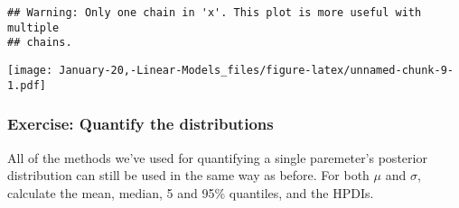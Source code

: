 \documentclass[]{article}
\begin{document}
\begin{verbatim}
## Warning: Only one chain in 'x'. This plot is more useful with multiple
## chains.
\end{verbatim}

\texttt{[image: January-20,-Linear-Models\_files/figure-latex/unnamed-chunk-9-1.pdf]}

\hypertarget{exercise-quantify-the-distributions}{%
\subsubsection{Exercise: Quantify the
distributions}\label{exercise-quantify-the-distributions}}

All of the methods we've used for quantifying a single paremeter's
posterior distribution can still be used in the same way as before. For
both \(\mu\) and \(\sigma\), calculate the mean, median, 5 and 95\%
quantiles, and the HPDIs.
\end{document}
